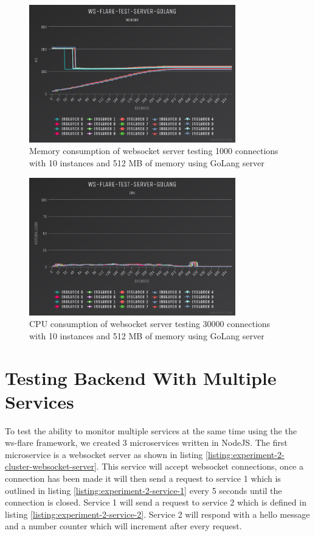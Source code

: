 \begin{figure}[H]
  \centering
    \includegraphics[width=0.8\textwidth]{figures/experiments/experiment-1/golang/memory-30000-512-10.png}
    \caption{Memory consumption of websocket server testing 1000 connections with 10 instances and 512 MB of memory using GoLang server}
    \label{fig:experiment-1-golang-memory-30000-512-10}
\end{figure}

\begin{figure}[H]
  \centering
    \includegraphics[width=0.8\textwidth]{figures/experiments/experiment-1/golang/cpu-30000-512-10.png}
    \caption{CPU consumption of websocket server testing 30000 connections with 10 instances and 512 MB of memory using GoLang server}
    \label{fig:experiment-1-golang-cpu-30000-512-10}
\end{figure}

\section{Testing Backend With Multiple Services}

To test the ability to monitor multiple services at the same time using the the ws-flare framework, we created 3 microservices written in NodeJS. The first microservice is a websocket server as shown in listing \ref{listing:experiment-2-cluster-websocket-server}. This service will accept websocket connections, once a connection has been made it will then send a request to service 1 which is outlined in listing \ref{listing:experiment-2-service-1} every 5 seconds until the connection is closed. Service 1 will send a request to service 2 which is defined in listing \ref{listing:experiment-2-service-2}. Service 2 will respond with a hello message and a number counter which will  increment after every request.

